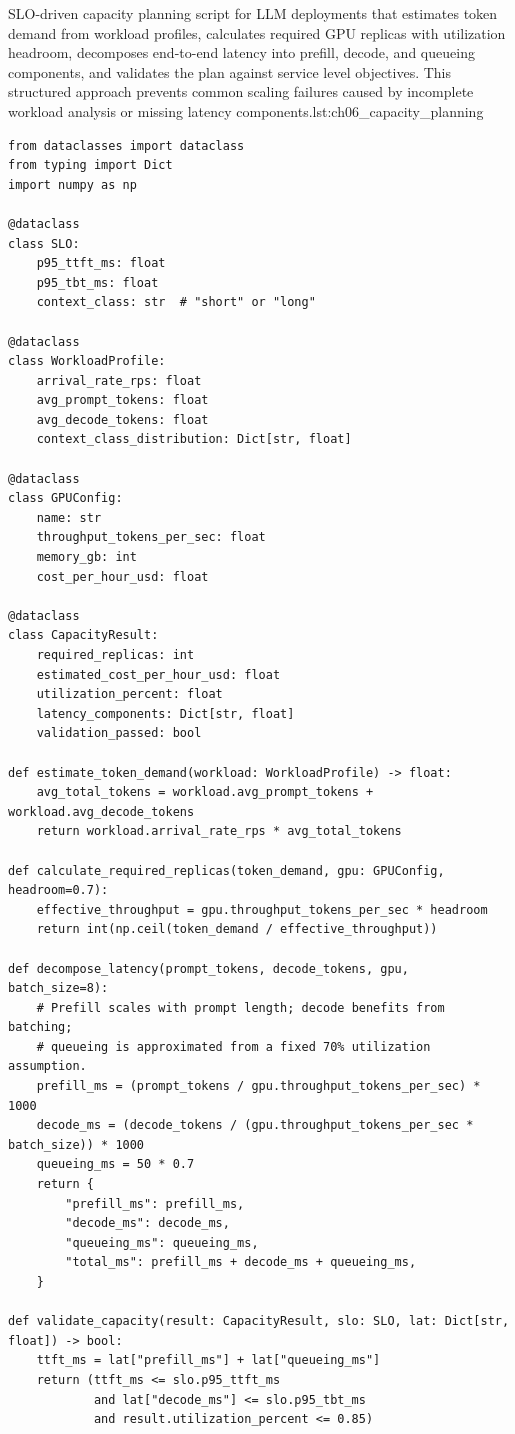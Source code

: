 \begin{codebox}{SLO-driven capacity planning script for LLM deployments that estimates token demand from workload profiles, calculates required GPU replicas with utilization headroom, decomposes end-to-end latency into prefill, decode, and queueing components, and validates the plan against service level objectives. This structured approach prevents common scaling failures caused by incomplete workload analysis or missing latency components.}{lst:ch06_capacity_planning}
\begin{verbatim}
from dataclasses import dataclass
from typing import Dict
import numpy as np

@dataclass
class SLO:
    p95_ttft_ms: float
    p95_tbt_ms: float
    context_class: str  # "short" or "long"

@dataclass
class WorkloadProfile:
    arrival_rate_rps: float
    avg_prompt_tokens: float
    avg_decode_tokens: float
    context_class_distribution: Dict[str, float]

@dataclass
class GPUConfig:
    name: str
    throughput_tokens_per_sec: float
    memory_gb: int
    cost_per_hour_usd: float

@dataclass
class CapacityResult:
    required_replicas: int
    estimated_cost_per_hour_usd: float
    utilization_percent: float
    latency_components: Dict[str, float]
    validation_passed: bool

def estimate_token_demand(workload: WorkloadProfile) -> float:
    avg_total_tokens = workload.avg_prompt_tokens + workload.avg_decode_tokens
    return workload.arrival_rate_rps * avg_total_tokens

def calculate_required_replicas(token_demand, gpu: GPUConfig, headroom=0.7):
    effective_throughput = gpu.throughput_tokens_per_sec * headroom
    return int(np.ceil(token_demand / effective_throughput))

def decompose_latency(prompt_tokens, decode_tokens, gpu, batch_size=8):
    # Prefill scales with prompt length; decode benefits from batching;
    # queueing is approximated from a fixed 70% utilization assumption.
    prefill_ms = (prompt_tokens / gpu.throughput_tokens_per_sec) * 1000
    decode_ms = (decode_tokens / (gpu.throughput_tokens_per_sec * batch_size)) * 1000
    queueing_ms = 50 * 0.7
    return {
        "prefill_ms": prefill_ms,
        "decode_ms": decode_ms,
        "queueing_ms": queueing_ms,
        "total_ms": prefill_ms + decode_ms + queueing_ms,
    }

def validate_capacity(result: CapacityResult, slo: SLO, lat: Dict[str, float]) -> bool:
    ttft_ms = lat["prefill_ms"] + lat["queueing_ms"]
    return (ttft_ms <= slo.p95_ttft_ms
            and lat["decode_ms"] <= slo.p95_tbt_ms
            and result.utilization_percent <= 0.85)


\end{verbatim}
\end{codebox}
